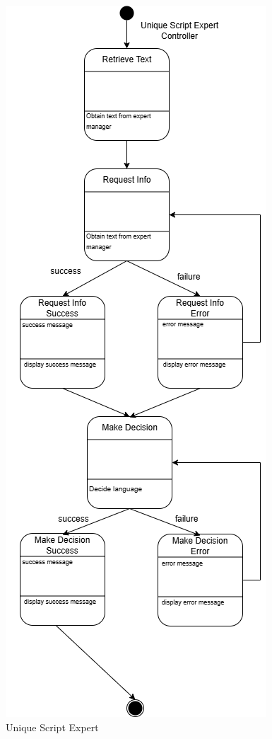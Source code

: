 \begin{figure}[H]
	\centering
	\includegraphics[width=\linewidth]{Section2/unique_script_expert_state_diagram.png}
	\caption{Unique Script Expert}
	\label{UniqueScriptExpert}
\end{figure}